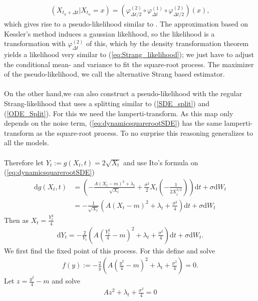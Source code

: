 \begin{align}
    \left(X_{t_n + \Delta t} | X_{t_n} = x\right) = \left(\varphi_{\Delta t/2}^{(2)} \circ \varphi_{\Delta t}^{(1)} \circ \varphi_{\Delta t/2}^{(2)}\right)(x),
\end{align} 
which gives rise to a pseudo-likelihood similar to \cite[(14)]{SplittingSchemes}. The approximation based on Kessler's method induces a gaussian likelihood, so the likelihood is a transformation with $\varphi_{\Delta t}^{(2)}$ of this, which by the density transformation theorem yields a likelihood very similar to (\ref{eq:Strang_likelihood}); we just have to adjust the conditional mean- and variance to fit the square-root process. The maximizer of the pseudo-likelihood, we call the alternative Strang based estimator.\\\\
On the other hand,we can also construct a pseudo-likelihood with the regular Strang-likelihood that uses a splitting similar to (\ref{SDE_split}) and (\ref{ODE_Split}). For this we need the lamperti-transform. As this map only depends on the noise term, (\ref{eq:dynamicsquarerootSDE}) has the same lamperti-transform as the square-root process. To no surprise this reasoning generalizes to all the models.\\\\
Therefore let $Y_t:= g(X_t, t) = 2\sqrt{X_t}$ and use Ito's formula on (\ref{eq:dynamicsquarerootSDE})
\begin{align}
    \mathrm{d}g(X_t, t) &= \left(-\frac{A(X_t - m)^2 + \lambda_t}{\sqrt{X_t}} + \frac{\sigma^2}{2}X_t\left(-\frac{1}{2X_t^{3/2}}\right)\right)\mathrm{d}t + \sigma\mathrm{d}W_t\nonumber \\
    &= -\frac{1}{\sqrt{X_t}}\left(A\left(X_t - m\right)^2 + \lambda_t + \frac{\sigma^2}{4}\right)\mathrm{d}t + \sigma\mathrm{d}W_t
\end{align}
Then as $X_t = \frac{Y_t^2}{4}$
\begin{align}
    \mathrm{d}Y_t = - \frac{2}{Y_t}\left(A\left(\frac{Y_t^2}{4} - m\right)^2 + \lambda_t + \frac{\sigma^2}{4}\right)\mathrm{d}t + \sigma \mathrm{d}W_t. \label{eq:lampertiTransformedDynamicSquareroot}
\end{align}
We first find the fixed point of this process. For this define and solve
\begin{align}
    f(y) := -\frac{2}{y}\left(A\left(\frac{y^2}{4}-m\right)^2 + \lambda_t + \frac{\sigma^2}{4}\right) = 0.
\end{align}
Let $z = \frac{y^2}{4}-m$ and solve
\begin{align}
    Az^2 + \lambda_t + \frac{\sigma^2}{4} = 0
\end{align}
